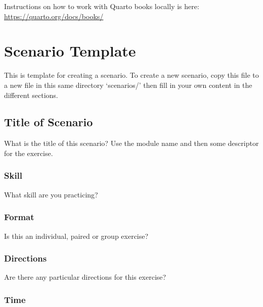 \documentclass[
  letterpaper,
  DIV=11,
  numbers=noendperiod]{scrreprt}
\begin{document}
Instructions on how to work with Quarto books locally is here:
\url{https://quarto.org/docs/books/}

\hypertarget{scenario-template}{%
\chapter*{Scenario Template}\label{scenario-template}}

This is template for creating a scenario. To create a new scenario, copy
this file to a new file in this same directory `scenarios/' then fill in
your own content in the different sections.

\hypertarget{title-of-scenario}{%
\section*{Title of Scenario}\label{title-of-scenario}}

What is the title of this scenario? Use the module name and then some
descriptor for the exercise.

\hypertarget{skill}{%
\subsection*{Skill}\label{skill}}

What skill are you practicing?

\hypertarget{format}{%
\subsection*{Format}\label{format}}

Is this an individual, paired or group exercise?

\hypertarget{directions}{%
\subsection*{Directions}\label{directions}}

Are there any particular directions for this exercise?

\hypertarget{time}{%
\subsection*{Time}\label{time}}
\end{document}
